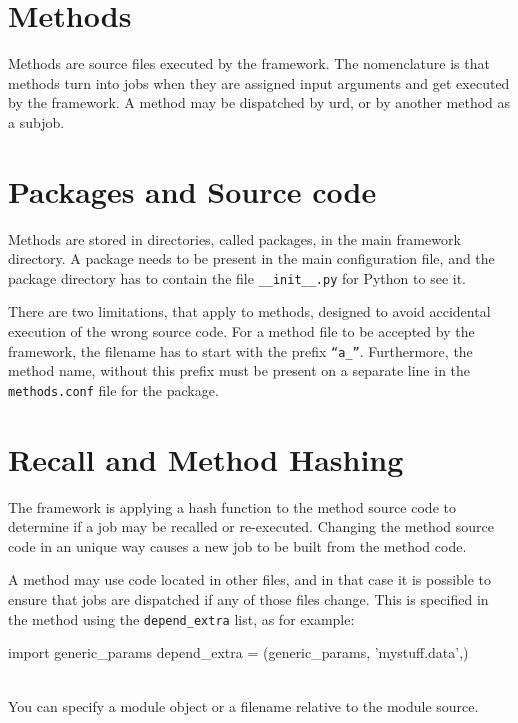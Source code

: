\section{Methods}

Methods are source files executed by the framework.  The nomenclature
is that methods turn into jobs when they are assigned input arguments
and get executed by the framework.  A method may be dispatched by urd,
or by another method as a subjob.



\section{Packages and Source code}

Methods are stored in directories, called packages, in the main
framework directory.  A package needs to be present in the main
configuration file, and the package directory has to contain the file
\texttt{\_\_init\_\_.py} for Python to see it.

There are two limitations, that apply to methods, designed to avoid
accidental execution of the wrong source code.  For a method file to
be accepted by the framework, the filename has to start with the
prefix \texttt{``a\_''}.  Furthermore, the method name, without this
prefix must be present on a separate line in the \texttt{methods.conf}
file for the package.



\section{Recall and Method Hashing}

The framework is applying a hash function to the method source code to
determine if a job may be recalled or re-executed.  Changing the
method source code in an unique way causes a new job to be built from
the method code.

A method may use code located in other files, and in that case it is
possible to ensure that jobs are dispatched if any of those files
change.  This is specified in the method using the
\texttt{depend\_extra} list, as for example:
\\
\begin{python}
import generic_params
depend_extra = (generic_params, 'mystuff.data',)
\end{python}
\\
You can specify a module object or a filename relative to the module
source.

